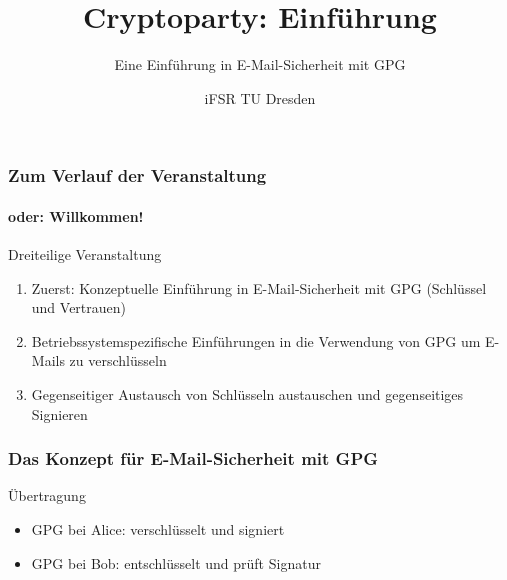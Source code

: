 \documentclass{beamer}
\title{Cryptoparty: Einführung}
\subtitle{Eine Einführung in E-Mail-Sicherheit mit GPG}
\author{iFSR TU Dresden}
\newcommand{\alice}[1][1cm]{\texttt{[image: img-src/alice.pdf]}}
\newcommand{\bob}[1][1cm]{\texttt{[image: img-src/bob.pdf]}}
\begin{document}
\begin{frame}
  \maketitle
\end{frame}

\begin{frame}
  \frametitle{Zum Verlauf der Veranstaltung}
  \framesubtitle{oder: Willkommen!}
  \begin{block}{Dreiteilige Veranstaltung}
  \begin{enumerate}
  \item Zuerst: Konzeptuelle Einführung in E-Mail-Sicherheit mit GPG (Schlüssel
    und Vertrauen)
  \item Betriebssystemspezifische Einführungen in die Verwendung von GPG um
    E-Mails zu verschlüsseln
  \item Gegenseitiger Austausch von Schlüsseln austauschen und gegenseitiges
    Signieren
  \end{enumerate}
  \end{block}
\end{frame}

\begin{frame}
  \frametitle{Das Konzept für E-Mail-Sicherheit mit GPG}
  \begin{block}{Übertragung}
    \begin{center}
    \end{center}
    \begin{itemize}
    \item GPG bei Alice: verschlüsselt und signiert
    \item GPG bei Bob: entschlüsselt und prüft Signatur
    \end{itemize}
  \end{block}
\end{frame}
\end{document}
